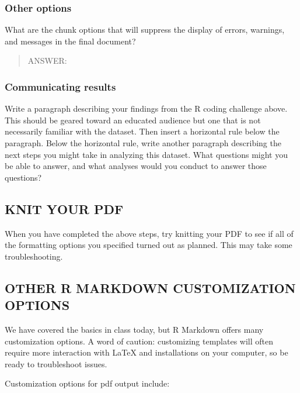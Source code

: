 \documentclass[
]{article}
\begin{document}
\hypertarget{other-options}{%
\subsubsection{Other options}\label{other-options}}

What are the chunk options that will suppress the display of errors,
warnings, and messages in the final document?

\begin{quote}
ANSWER:
\end{quote}

\hypertarget{communicating-results}{%
\subsubsection{Communicating results}\label{communicating-results}}

Write a paragraph describing your findings from the R coding challenge
above. This should be geared toward an educated audience but one that is
not necessarily familiar with the dataset. Then insert a horizontal rule
below the paragraph. Below the horizontal rule, write another paragraph
describing the next steps you might take in analyzing this dataset. What
questions might you be able to answer, and what analyses would you
conduct to answer those questions?

\hypertarget{knit-your-pdf}{%
\subsection{KNIT YOUR PDF}\label{knit-your-pdf}}

When you have completed the above steps, try knitting your PDF to see if
all of the formatting options you specified turned out as planned. This
may take some troubleshooting.

\hypertarget{other-r-markdown-customization-options}{%
\subsection{OTHER R MARKDOWN CUSTOMIZATION
OPTIONS}\label{other-r-markdown-customization-options}}

We have covered the basics in class today, but R Markdown offers many
customization options. A word of caution: customizing templates will
often require more interaction with LaTeX and installations on your
computer, so be ready to troubleshoot issues.

Customization options for pdf output include:
\end{document}
